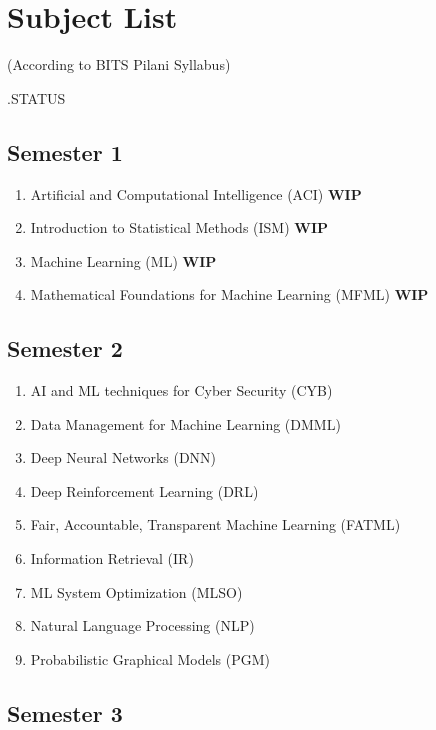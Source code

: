 \chapter*{Subject List}

\begin{center}
(According to BITS Pilani Syllabus)
\end{center}

.\hfill STATUS

\section*{Semester 1}
\begin{enumerate}
    \item Artificial and Computational Intelligence (ACI)
        \hfill \textbf{WIP}
    \item Introduction to Statistical Methods (ISM)    
        \hfill \textbf{WIP}
    \item Machine Learning (ML)
        \hfill \textbf{WIP}
    \item Mathematical Foundations for Machine Learning (MFML)
        \hfill \textbf{WIP}
\end{enumerate}


\section*{Semester 2}

\begin{enumerate}
    \item AI and ML techniques for Cyber Security (CYB)
    \item Data Management for Machine Learning (DMML)
    \item Deep Neural Networks (DNN)
    \item Deep Reinforcement Learning (DRL)
    \item Fair, Accountable, Transparent Machine Learning (FATML)
    \item Information Retrieval (IR)
    \item ML System Optimization (MLSO)
    \item Natural Language Processing (NLP)
    \item Probabilistic Graphical Models (PGM)
\end{enumerate}


\section*{Semester 3}

